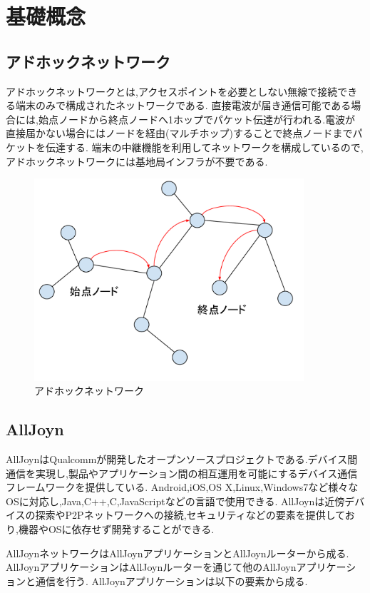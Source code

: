 \chapter{基礎概念}
\label{chap:concept}

\section{アドホックネットワーク}
アドホックネットワークとは,アクセスポイントを必要としない無線で接続できる端末のみで構成されたネットワークである.
直接電波が届き通信可能である場合には,始点ノードから終点ノードへ1ホップでパケット伝達が行われる.電波が直接届かない場合にはノードを経由(マルチホップ)することで終点ノードまでパケットを伝達する.
端末の中継機能を利用してネットワークを構成しているので,アドホックネットワークには基地局インフラが不要である.

\begin{figure}[htbp]
\centering
\includegraphics[width=10cm]{fig/ad-hoc.pdf}
\caption{アドホックネットワーク}
\end{figure}

\section{AllJoyn}
AllJoynはQualcommが開発したオープンソースプロジェクトである.デバイス間通信を実現し,製品やアプリケーション間の相互運用を可能にするデバイス通信フレームワークを提供している.
Android,iOS,OS X,Linux,Windows7など様々なOSに対応し,Java,C++,C,JavaScriptなどの言語で使用できる.
AllJoynは近傍デバイスの探索やP2Pネットワークへの接続,セキュリティなどの要素を提供しており,機器やOSに依存せず開発することができる.


AllJoynネットワークはAllJoynアプリケーションとAllJoynルーターから成る.
AllJoynアプリケーションはAllJoynルーターを通じて他のAllJoynアプリケーションと通信を行う.
AllJoynアプリケーションは以下の要素から成る.

